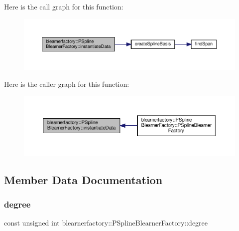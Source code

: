 Here is the call graph for this function\+:
\nopagebreak
\begin{figure}[H]
\begin{center}
\leavevmode
\includegraphics[width=350pt]{classblearnerfactory_1_1_p_spline_blearner_factory_a290a1c60224d027059939a895b474aa1_cgraph}
\end{center}
\end{figure}
Here is the caller graph for this function\+:
\nopagebreak
\begin{figure}[H]
\begin{center}
\leavevmode
\includegraphics[width=350pt]{classblearnerfactory_1_1_p_spline_blearner_factory_a290a1c60224d027059939a895b474aa1_icgraph}
\end{center}
\end{figure}


\subsection{Member Data Documentation}
\mbox{\label{classblearnerfactory_1_1_p_spline_blearner_factory_a8cfdf9e919e6392b2cba293dd5d931d5}} 
\subsubsection{\texorpdfstring{degree}{degree}}
{\footnotesize\ttfamily const unsigned int blearnerfactory\+::\+P\+Spline\+Blearner\+Factory\+::degree\hspace{0.3cm}{\ttfamily [private]}}



